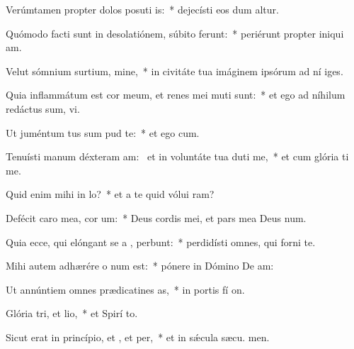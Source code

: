 \item Verúmtamen propter dolos posuti is:~* dejecísti eos dum altur.
\item Quómodo facti sunt in desolatiónem, súbito ferunt:~* periérunt propter iniqui am.
\item Velut sómnium surtium, mine,~* in civitáte tua imáginem ipsórum ad ní iges.
\item Quia inflammátum est cor meum, et renes mei muti sunt:~* et ego ad níhilum redáctus sum,  vi.
\item Ut juméntum tus sum pud te:~* et ego  cum.
\item Tenuísti manum déxteram am:~\pscross{} et in voluntáte tua duti me,~* et cum glória ti me.
\item Quid enim mihi  in lo?~* et a te quid vólui  ram?
\item Defécit caro mea,  cor um:~* Deus cordis mei, et pars mea Deus  num.
\item Quia ecce, qui elóngant se a , perbunt:~* perdidísti omnes, qui forni  te.
\item Mihi autem adhærére o num est:~* pónere in Dómino De  am:
\item Ut annúntiem omnes prædicatines as,~* in portis fí on.
\item Glória tri, et lio,~* et Spirí to.
\item Sicut erat in princípio, et , et per,~* et in sǽcula sæcu. men.
